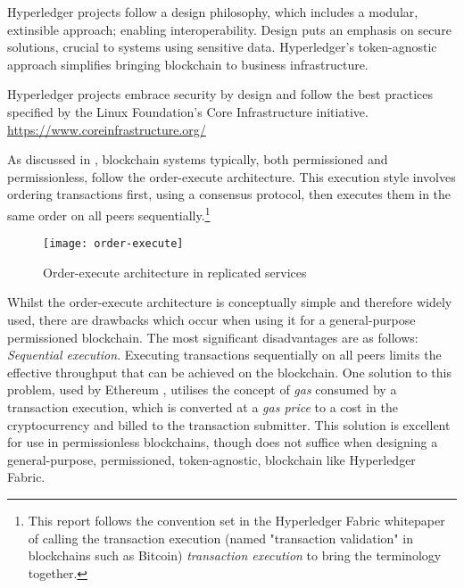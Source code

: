 Hyperledger projects follow a design philosophy, which includes a modular, extinsible approach; enabling interoperability.
Design puts an emphasis on secure solutions, crucial to systems using sensitive data.
Hyperledger's token-agnostic approach simplifies bringing blockchain to business infrastructure. \cite{noauthor_hyperledger_2017}

Hyperledger projects embrace security by design and follow the best practices specified by the Linux Foundation's Core Infrastructure initiative. \url{https://www.coreinfrastructure.org/}

As discussed in \cite{androulaki_hyperledger_2018}, blockchain systems typically, both permissioned and permissionless, follow the order-execute architecture. 
This execution style involves ordering transactions first, using a consensus protocol, then executes them in the same order on all peers sequentially.\footnote{This report follows the convention set in the Hyperledger Fabric whitepaper of calling the transaction execution (named "transaction validation" in blockchains such as Bitcoin) \emph{transaction execution} to bring the terminology together.}
\begin{figure}[H]
  \texttt{[image: order-execute]}
  \caption{Order-execute architecture in replicated services}
\end{figure}

Whilst the order-execute architecture is conceptually simple and therefore widely used, there are drawbacks which occur when using it for a general-purpose permissioned blockchain.\cite{androulaki_hyperledger_2018}
The most significant disadvantages are as follows: 
\emph{Sequential execution}. Executing transactions sequentially on all peers limits the effective throughput that can be achieved on the blockchain.\cite{androulaki_hyperledger_2018} 
One solution to this problem, used by Ethereum \cite{wood_ethereum_nodate}, utilises the concept of \emph{gas} consumed by a transaction execution, which is converted at a \emph{gas price} to a cost in the cryptocurrency and billed to the transaction submitter.
This solution is excellent for use in permissionless blockchains, though does not suffice when designing a general-purpose, permissioned, token-agnostic, blockchain like Hyperledger Fabric. \cite{androulaki_hyperledger_2018} \linebreak[1]


